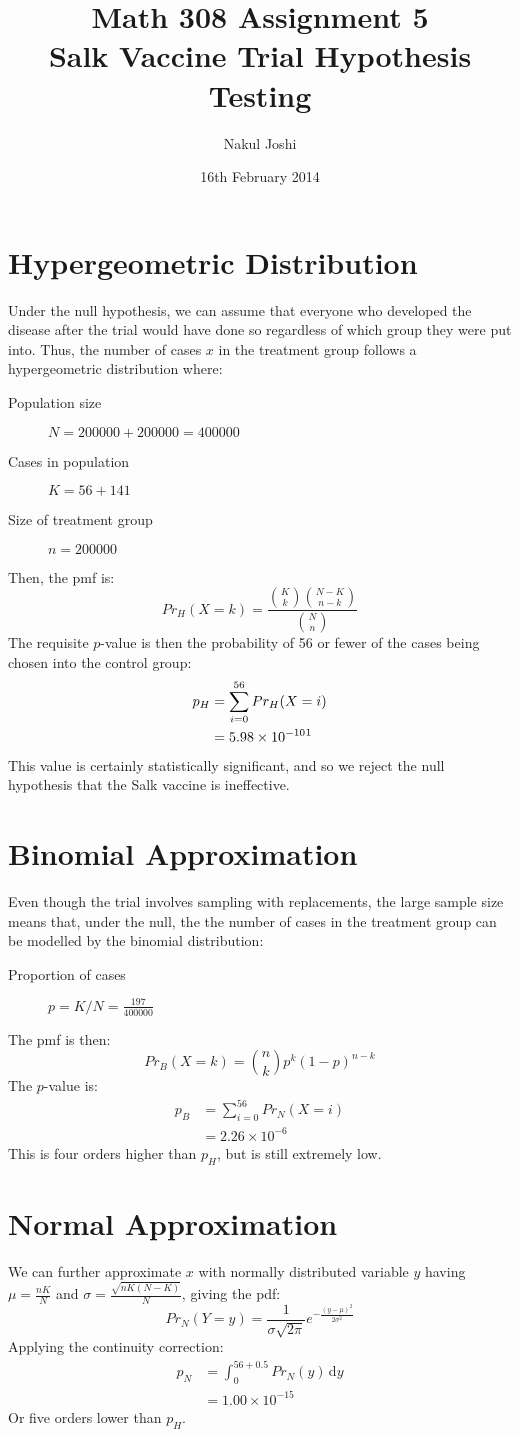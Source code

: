 \documentclass[twocolumn]{article}
\title{Math 308 Assignment 5\\Salk Vaccine Trial Hypothesis Testing}
\author{Nakul Joshi}
\date{16th February 2014}
\newcommand{\intg}[4]{\int_{#1}^{#2} \! #3 \, \mathrm{d}#4}
\begin{document}
\maketitle
\thispagestyle{empty}
\pagestyle{empty}
\section{Hypergeometric Distribution}
Under the null hypothesis, we can assume that everyone who developed the disease after the trial would have done so regardless of which group they were put into. Thus, the number of cases $x$ in the treatment group follows a hypergeometric distribution where:\begin{description}
\item[Population size] $N=200000+200000=400000$
\item[Cases in population] $K=56+141$
\item[Size of treatment group] $n=200000$
\end{description}
Then, the pmf is:\[
Pr_{H}(X=k)=\frac{\binom{K}{k}\binom{N-K}{n-k}}{\binom{N}{n}}
\]
The requisite $p$-value is then the probability of 56 or fewer of the cases being chosen into the control group:\begin{align*}
p_H&=\sum_{i=0}^{56}Pr_H(X=i)\\
&=5.98\times 10^{-10} \text{\footnotemark}
\end{align*}
This value is certainly statistically significant, and so we reject the null hypothesis that the Salk vaccine is ineffective.

\section{Binomial Approximation}
Even though the trial involves sampling with replacements, the large sample size means that, under the null, the the number of cases in the treatment group can be modelled by the binomial distribution:\begin{description}
\item[Proportion of cases] $p=K/N=\frac{197}{400000}$
\end{description}
The pmf is then:\[
Pr_{B}(X=k)=\binom{n}{k}p^{k}(1-p)^{n-k}
\]
The $p$-value is:\begin{align*}
p_B&=\sum_{i=0}^{56}Pr_{N}(X=i)\\
&=2.26\times 10^{-6}
\end{align*}
This is four orders higher than $p_H$, but is still extremely low.

\section{Normal Approximation}
We can further approximate $x$ with normally distributed variable $y$ having $\mu=\frac{n K}{N}$ and $\sigma=\frac{\sqrt{n K (N-K)}}{N}$, giving the pdf:\[
Pr_N(Y=y)=\frac{1}{\sigma\sqrt{2\pi}}e^{-\frac{(y-\mu)^2}{2\sigma^2}}
\]
Applying the continuity correction:\begin{align*}
p_N&=\intg{0}{56+0.5}{Pr_N(y)}{y}\\
&=1.00\times10^{-15}
\end{align*}
Or five orders lower than $p_H$.
\end{document}
